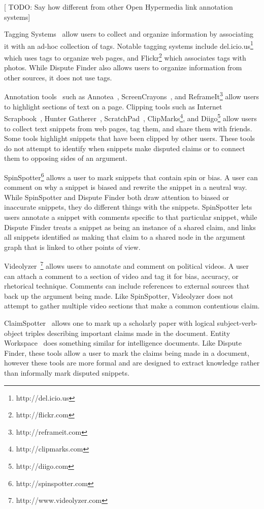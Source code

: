 \documentclass{www2010-submission}
\newcommand{\todo}[1]{{[\color{blue} TODO: #1]}}
\begin{document}
\todo{Say how different from other Open Hypermedia link annotation systems}

Tagging Systems~\cite{Marlow2006,Golder2006} allow users to collect and organize information by associating it with an ad-hoc collection of tags. Notable tagging systems include del.icio.us\footnote{http://del.icio.us} which uses tags to organize web pages, and Flickr\footnote{http://flickr.com} which associates tags with photos. While Dispute Finder also allows users to organize information from other sources, it does not use tags.

Annotation tools~\cite{Marshall1998} such as Annotea~\cite{Koivunen2001}, ScreenCrayons~\cite{Olsen2004}, and ReframeIt\footnote{http://reframeit.com} allow users to highlight sections of text on a page. Clipping tools such as Internet Scrapbook~\cite{Sugiura1998}, Hunter Gatherer~\cite{Schraefel2002}, ScratchPad~\cite{Gotz2007}, ClipMarks\footnote{http://clipmarks.com}, and Diigo\footnote{http://diigo.com} allow users to collect text snippets from web pages, tag them, and share them with friends. Some tools highlight snippets that have been clipped by other users. These tools do not attempt to identify when snippets make disputed claims or to connect them to opposing sides of an argument.

SpinSpotter\footnote{http://spinspotter.com} allows a user to mark snippets that contain spin or bias. A user can comment on why a snippet is biased and rewrite the snippet in a neutral way. While SpinSpotter and Dispute Finder both draw attention to biased or inaccurate snippets, they do different things with the snippets. SpinSpotter lets users annotate a snippet with comments specific to that particular snippet, while Dispute Finder treats a snippet as being an instance of a shared claim, and links all snippets identified as making that claim to a shared node in the argument graph that is linked to other points of view.

Videolyzer~\cite{Diakopoulos2008}\footnote{http://www.videolyzer.com} allows users to annotate and comment on political videos. A user can attach a comment to a section of video and tag it for bias, accuracy, or rhetorical technique. Comments can include references to external sources that back up the argument being made. Like SpinSpotter, Videolyzer does not attempt to gather multiple video sections that make a common contentious claim.

ClaimSpotter~\cite{Sereno2005,Sereno2004} allows one to mark up a scholarly paper with logical subject-verb-object triples describing important claims made in the document. Entity Workspace~\cite{Bier2006} does something similar for intelligence documents. Like Dispute Finder, these tools allow a user to mark the claims being made in a document, however these tools are more formal and are designed to extract knowledge rather than informally mark disputed snippets.
\end{document}
